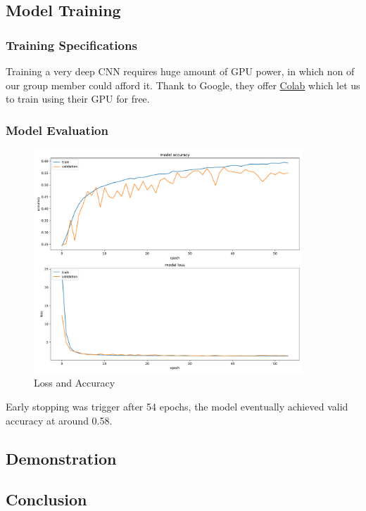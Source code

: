 \documentclass[11pt,a4paper]{article}
\begin{document}
    \subsection{Model Training}
    \subsubsection{Training Specifications}
    Training a very deep CNN requires huge amount of GPU power, in which non of our group member could afford it. Thank to Google, they offer \href{https://research.google.com/colaboratory/}{Colab} which let us to train using their GPU for free.
    
    \subsubsection{Model Evaluation}
    \begin{figure}[H]
        \centering
        \includegraphics[width = 0.9\textwidth]{emotion_detection/plot/history.pdf}
        \caption{Loss and Accuracy}
        \label{fig:loss_acc}
    \end{figure}
    Early stopping was trigger after 54 epochs, the model eventually achieved valid accuracy at around 0.58.
    
    \subsection{Demonstration}
    
    \subsection{Conclusion}
    
\end{document}
